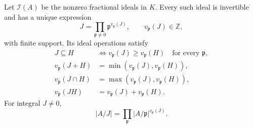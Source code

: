 \begin{lemma}\label{lem:sz-factorization}
Let \(\mathcal I(A)\) be the nonzero fractional ideals in \(K\).
Every such ideal is invertible and has a unique expression
\begin{equation}\label{eq:sz-ordinary-factor}
 J=\prod_{\mathfrak p\ne0}\mathfrak p^{v_{\mathfrak p}(J)},
 \qquad v_{\mathfrak p}(J)\in\mathbb Z,
\end{equation}
with finite support. Its ideal operations satisfy
\begin{align*}
 J\subseteq H&\iff v_{\mathfrak p}(J)\ge v_{\mathfrak p}(H)
                  \quad\text{for every }\mathfrak p,\\
 v_{\mathfrak p}(J+H)&=\min(v_{\mathfrak p}(J),v_{\mathfrak p}(H)),\\
 v_{\mathfrak p}(J\cap H)&=\max(v_{\mathfrak p}(J),v_{\mathfrak p}(H)),\\
 v_{\mathfrak p}(JH)&=v_{\mathfrak p}(J)+v_{\mathfrak p}(H).
\end{align*}
For integral \(J\ne0\),
\begin{equation}\label{eq:sz-ordinary-norm}
 |A/J|=\prod_{\mathfrak p}|A/\mathfrak p|^{v_{\mathfrak p}(J)}.
\end{equation}
\end{lemma}
